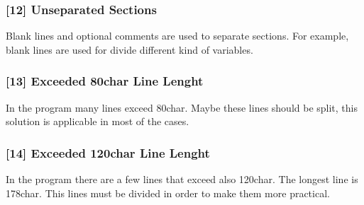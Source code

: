 \subsubsection{[12] Unseparated Sections}
Blank lines and optional comments are used to separate sections. For example, blank lines are used for divide different kind of variables.

\subsubsection{[13] Exceeded 80char Line Lenght}
In the program many lines exceed 80char. Maybe these lines should be split, this solution is applicable in most of the cases.
\subsubsection{[14] Exceeded 120char Line Lenght}
In the program there are a few lines that exceed also 120char. The longest line is 178char. This lines must be divided in order to make them more practical.
